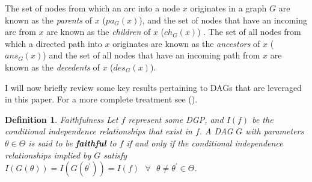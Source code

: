 \documentclass{article}
\newtheorem{definition}{Definition}
\begin{document}
The set of nodes from which an arc into a node $x$ originates in a graph $G$ are known as the \textit{parents} of $x$ ($pa_G(x)$), and the set of nodes that have an incoming arc from $x$ are known as the \textit{children} of $x$ ($ch_G(x)$) \parencite{pearl2009causality}. The set of all nodes from which a directed path into $x$ originates are known as the \textit{ancestors} of $x$ ($ans_G(x)$) and the set of all nodes that have an incoming path from $x$ are known as the \textit{decedents} of $x$ ($des_G(x)$). 

I will now briefly review some key results pertaining to DAGs that are leveraged in this paper. For a more complete treatment see \citeauthor{pearl2009causality} (\citeyear{pearl2009causality}).

\theoremstyle{definition}
\begin{definition}{Faithfulness}
  Let $f$ represent some DGP, and $I(f)$ be the conditional independence relationships that exist in $f$. A DAG $G$ with parameters $\theta \in \Theta$ is said to be \textbf{faithful} to $f$ if and only if the conditional independence relationships implied by $G$ satisfy $I(G(\theta)) = I(G(\theta^\prime)) = I(f) \text{  } \forall \text{  } \theta \not = \theta^\prime \in \Theta$.
  \parencite[p.48]{pearl2009causality}
  \label{faithfulness}
\end{definition}
\end{document}
